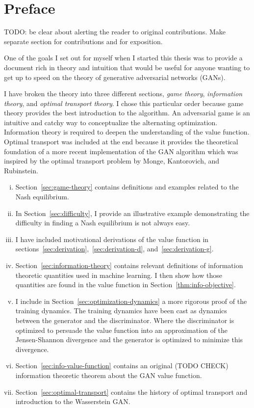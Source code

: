 \section*{Preface}

TODO: be clear about alerting the reader to original contributions.
Make separate section for contributions and for exposition.

One of the goals I set out for myself when I started this thesis was
to provide a document rich in theory and intuition that would be
useful for anyone wanting to get up to speed on the theory of
generative adversarial networks (GANs).

I have broken the theory into three different sections, \textit{game
  theory}, \textit{information theory}, and \textit{optimal transport
  theory}.  I chose this particular order because game theory provides
the best introduction to the algorithm.  An adversarial game is an
intuitive and catchy way to conceptualize the alternating
optimization.  Information theory is required to deepen the
understanding of the value function.  Optimal transport was included
at the end because it provides the theoretical foundation of a more
recent implementation of the GAN algorithm which was inspired by the
optimal transport problem by Monge, Kantorovich, and Rubinstein.


\begin{enumerate}[(i)]
\item Section~\ref{sec:game-theory} contains definitions and examples
  related to the Nash equilibrium.
\item In Section~\ref{sec:difficulty}, I provide an illustrative
  example demonstrating the difficulty in finding a Nash equilibrium
  is not always easy.
\item I have included motivational derivations of the value function
  in sections~\ref{sec:derivation},~\ref{sec:derivation-d},
  and~\ref{sec:derivation-g}.
\item Section~\ref{sec:information-theory} contains relevant
  definitions of information theoretic quantities used in machine
  learning. I then show how those quantities are found in the value
  function in Section~\ref{thm:info-objective}.
\item I include in Section~\ref{sec:optimization-dynamics} a more
  rigorous proof of the training dynamics.  The training dynamics have
  been cast as dynamics between the generator and the discriminator.
  Where the discriminator is optimized to persuade the value function
  into an approximation of the Jensen-Shannon divergence and the
  generator is optimized to minimize this divergence.
\item Section~\ref{sec:info-value-function} contains an original (TODO
  CHECK) information theoretic theorem about the GAN value function.
\item Section~\ref{sec:optimal-transport} contains the history of
  optimal transport and introduction to the Wasserstein GAN.
\end{enumerate}

